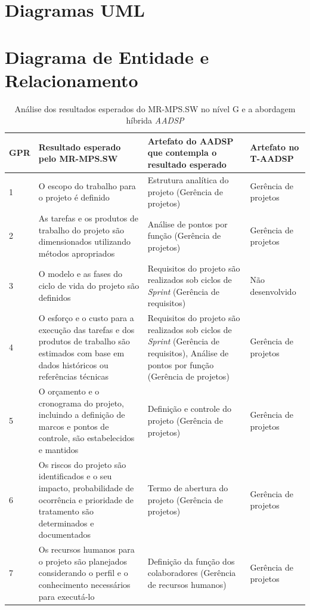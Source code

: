 \documentclass{acm_proc_article-sp}
\begin{document}
\begin{appendices}
\chapter{Diagramas UML}

\chapter{Diagrama de Entidade e Relacionamento}

\begin{table}[h]
\scriptsize
\caption{Análise dos resultados esperados do MR-MPS.SW no nível G e a abordagem híbrida \textit{AADSP} \cite{aadsp:hibirdo}} 
\centering
\begin{tabular}{|p{10mm}|p{60mm}|p{60mm}|p{25mm}|}
\hline
\textbf{GPR} & \textbf{Resultado esperado pelo MR-MPS.SW} & \textbf{Artefato do AADSP que contempla o resultado esperado} & \textbf{Artefato no T-AADSP} \\
\hline
1 & O escopo do trabalho para o projeto é definido & Estrutura analítica do projeto
(Gerência de projetos) & Gerência de projetos \\
2 & As tarefas e os produtos de trabalho do projeto são dimensionados utilizando métodos apropriados & Análise de pontos por função (Gerência de projetos) & Gerência de projetos\\
3 & O modelo e as fases do ciclo de vida do projeto são definidos & Requisitos do projeto são realizados sob ciclos de \textit{Sprint} (Gerência de requisitos) & Não desenvolvido\\
4 &  O esforço e o custo para a execução das tarefas e dos produtos de trabalho são estimados com base em dados históricos ou referências técnicas & Requisitos do projeto são realizados sob ciclos de \textit{Sprint} (Gerência de requisitos), Análise de pontos por função (Gerência de projetos) & Gerência de projetos\\
5 & O orçamento e o cronograma do projeto, incluindo a definição de marcos e pontos de controle, são estabelecidos e mantidos
& Definição e controle do projeto (Gerência de projetos) & Gerência de projetos\\
6 & Os riscos do projeto são identificados e o seu impacto, probabilidade de ocorrência e prioridade de tratamento são
determinados e documentados & Termo de abertura do projeto (Gerência de projetos) & Gerência de projetos\\
7 & Os recursos humanos para o projeto são planejados considerando o perfil e o conhecimento necessários para executá-lo & Definição da função dos colaboradores (Gerência de recursos humanos) & Gerência de projetos\\

\end{tabular}
\end{table}
\end{appendices}
\end{document}
